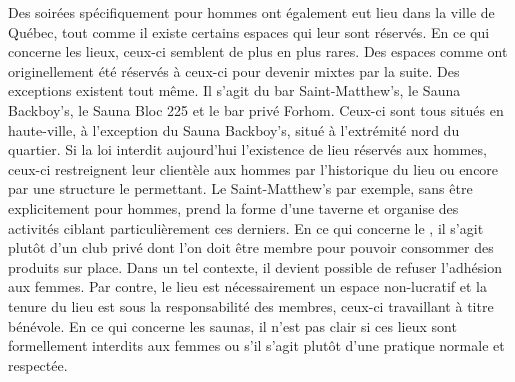 Des soirées spécifiquement pour hommes ont également eut lieu dans la ville de Québec, tout comme il existe certains espaces qui leur sont réservés.
En ce qui concerne les lieux, ceux-ci semblent de plus en plus rares.
Des espaces comme  ont originellement été réservés à ceux-ci pour devenir mixtes par la suite.
Des exceptions existent tout même.
Il s'agit du bar Saint-Matthew's, le Sauna Backboy's, le Sauna Bloc 225 et le bar privé Forhom.
Ceux-ci sont tous situés en haute-ville, à l'exception du Sauna Backboy's, situé à l'extrémité nord du quartier.
Si la loi interdit aujourd'hui l'existence de lieu réservés aux hommes, ceux-ci restreignent leur clientèle aux hommes par l'historique du lieu ou encore par une structure le permettant.
Le Saint-Matthew's par exemple, sans être explicitement pour hommes, prend la forme d'une taverne et organise des activités ciblant particulièrement ces derniers.
En ce qui concerne le , il s'agit plutôt d'un club privé dont l'on doit être membre pour pouvoir consommer des produits sur place.
Dans un tel contexte, il devient possible de refuser l'adhésion aux femmes.
Par contre, le lieu est nécessairement un espace non-lucratif et la tenure du lieu est sous la responsabilité des membres, ceux-ci travaillant à titre bénévole.
En ce qui concerne les saunas, il n'est pas clair si ces lieux sont formellement interdits aux femmes ou s'il s'agit plutôt d'une pratique normale et respectée.

